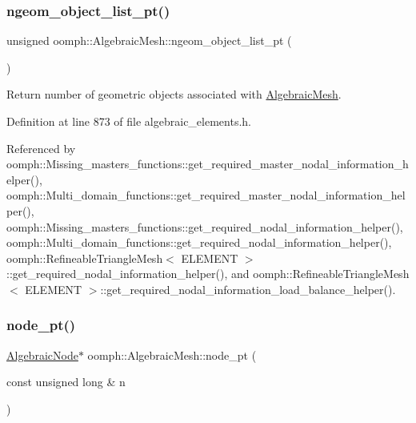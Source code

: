 \mbox{\label{classoomph_1_1AlgebraicMesh_ab6a636ffb928e10e004747988fb03404}} 
\subsubsection{\texorpdfstring{ngeom\+\_\+object\+\_\+list\+\_\+pt()}{ngeom\_object\_list\_pt()}}
{\footnotesize\ttfamily unsigned oomph\+::\+Algebraic\+Mesh\+::ngeom\+\_\+object\+\_\+list\+\_\+pt (\begin{DoxyParamCaption}{ }\end{DoxyParamCaption})\hspace{0.3cm}{\ttfamily [inline]}}



Return number of geometric objects associated with \hyperlink{classoomph_1_1AlgebraicMesh}{Algebraic\+Mesh}. 



Definition at line 873 of file algebraic\+\_\+elements.\+h.



Referenced by oomph\+::\+Missing\+\_\+masters\+\_\+functions\+::get\+\_\+required\+\_\+master\+\_\+nodal\+\_\+information\+\_\+helper(), oomph\+::\+Multi\+\_\+domain\+\_\+functions\+::get\+\_\+required\+\_\+master\+\_\+nodal\+\_\+information\+\_\+helper(), oomph\+::\+Missing\+\_\+masters\+\_\+functions\+::get\+\_\+required\+\_\+nodal\+\_\+information\+\_\+helper(), oomph\+::\+Multi\+\_\+domain\+\_\+functions\+::get\+\_\+required\+\_\+nodal\+\_\+information\+\_\+helper(), oomph\+::\+Refineable\+Triangle\+Mesh$<$ E\+L\+E\+M\+E\+N\+T $>$\+::get\+\_\+required\+\_\+nodal\+\_\+information\+\_\+helper(), and oomph\+::\+Refineable\+Triangle\+Mesh$<$ E\+L\+E\+M\+E\+N\+T $>$\+::get\+\_\+required\+\_\+nodal\+\_\+information\+\_\+load\+\_\+balance\+\_\+helper().

\mbox{\label{classoomph_1_1AlgebraicMesh_aedeebbe95d2f8e67e9939cecd1be3933}} 
\subsubsection{\texorpdfstring{node\+\_\+pt()}{node\_pt()}}
{\footnotesize\ttfamily \hyperlink{classoomph_1_1AlgebraicNode}{Algebraic\+Node}$\ast$ oomph\+::\+Algebraic\+Mesh\+::node\+\_\+pt (\begin{DoxyParamCaption}\item[{const unsigned long \&}]{n }\end{DoxyParamCaption})\hspace{0.3cm}{\ttfamily [inline]}}



